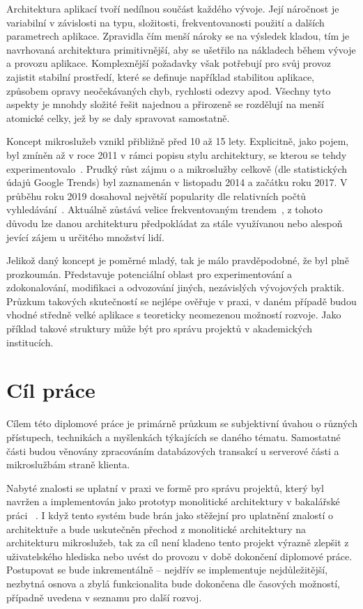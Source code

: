 
Architektura aplikací tvoří nedílnou součást každého vývoje.
Její náročnost je variabilní v závislosti na typu, složitosti, frekventovanosti použití a dalších parametrech aplikace.
Zpravidla čím menší nároky se na výsledek kladou, tím je navrhovaná architektura primitivnější, aby se ušetřilo na nákladech během vývoje a provozu aplikace.
Komplexnější požadavky však potřebují pro svůj provoz zajistit stabilní prostředí, které se definuje například stabilitou aplikace, způsobem opravy neočekávaných chyb, rychlosti odezvy apod.
Všechny tyto aspekty je mnohdy složité řešit najednou a přirozeně se rozdělují na menší atomické celky, jež by se daly spravovat samostatně.

Koncept mikroslužeb vznikl přibližně před 10 až 15 lety.
Explicitně, jako pojem, byl zmíněn až v roce 2011 v rámci popisu stylu architektury, se kterou se tehdy experimentovalo~\cite{msabegin}.
Prudký růst zájmu o  a mikroslužby celkově (dle statistických údajů Google Trends) byl zaznamenán v listopadu 2014 a začátku roku 2017.
V průběhu roku 2019 dosahoval největší popularity dle relativních počtů vyhledávání~\cite{googletrendsmsa}.
Aktuálně  zůstává velice frekventovaným trendem~\cite{googletrendsmsa}, z tohoto důvodu lze danou architekturu předpokládat za stále využívanou nebo alespoň jevící zájem u určitého množství lidí.

Jelikož daný koncept je poměrné mladý, tak je málo pravděpodobné, že byl plně prozkoumán.
Představuje potenciální oblast pro experimentování a zdokonalování, modifikaci a odvozování jiných, nezávislých vývojových praktik.
Průzkum takových skutečností se nejlépe ověřuje v praxi, v daném případě budou vhodné středně velké aplikace s teoreticky neomezenou možností rozvoje.
Jako příklad takové struktury může být  pro správu projektů v akademických institucích.

\clearpage



\section{Cíl práce}\label{sec:cil-prace}
Cílem této diplomové práce je primárně průzkum  se subjektivní úvahou o různých přístupech, technikách a myšlenkách týkajících se daného tématu.
Samostatné části budou věnovány zpracováním databázových transakcí u serverové části a mikroslužbám straně klienta.

Nabyté znalosti se uplatní v praxi ve formě  pro správu projektů, který byl navržen a implementován jako prototyp monolitické architektury v bakalářské práci ~\cite{bachelorthesis}.
I když tento systém bude brán jako stěžejní pro uplatnění znalostí o architektuře a bude uskutečněn přechod z monolitické architektury na architekturu mikroslužeb, tak za cíl není kladeno tento projekt výrazně zlepšit z uživatelského hlediska nebo uvést do provozu v době dokončení diplomové práce.
Postupovat se bude inkrementálně – nejdřív se implementuje nejdůležitější, nezbytná osnova a zbylá funkcionalita bude dokončena dle časových možností, případně uvedena v seznamu pro další rozvoj.


